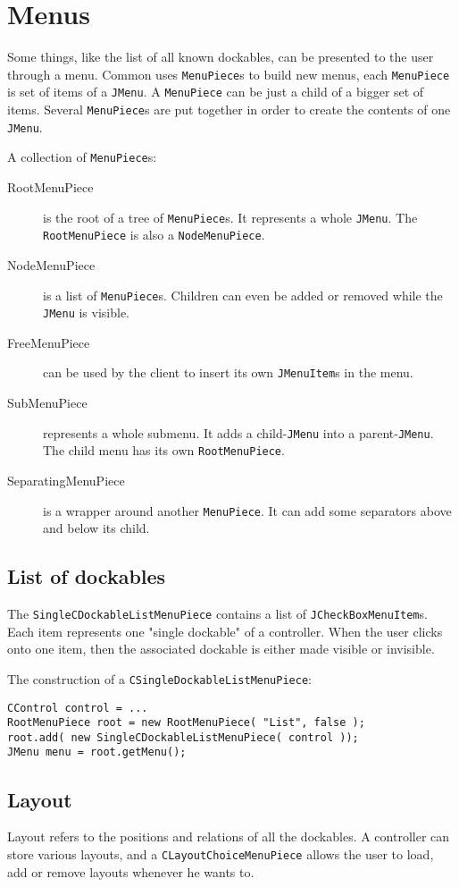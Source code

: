 \documentclass[a4paper,10pt]{article}
\newcommand{\src}[1]{\lstinline[basicstyle=\ttfamily]|#1|}
\begin{document}
\section{Menus}
Some things, like the list of all known dockables, can be presented to the user through a menu. Common uses \src{MenuPiece}s to build new menus, each \src{MenuPiece} is set of items of a \src{JMenu}. A \src{MenuPiece} can be just a child of a bigger set of items. Several \src{MenuPiece}s are put together in order to create the contents of one \src{JMenu}.

A collection of \src{MenuPiece}s:
\begin{description}
 \item[RootMenuPiece] is the root of a tree of \src{MenuPiece}s. It represents a whole \src{JMenu}. The \src{RootMenuPiece} is also a \src{NodeMenuPiece}.
 \item[NodeMenuPiece] is a list of \src{MenuPiece}s. Children can even be added or removed while the \src{JMenu} is visible.
 \item[FreeMenuPiece] can be used by the client to insert its own \src{JMenuItem}s in the menu.
 \item[SubMenuPiece] represents a whole submenu. It adds a child-\src{JMenu} into a parent-\src{JMenu}. The child menu has its own \src{RootMenuPiece}.
 \item[SeparatingMenuPiece] is a wrapper around another \src{MenuPiece}. It can add some separators above and below its child.
\end{description}

\subsection{List of dockables}
The \src{SingleCDockableListMenuPiece} contains a list of \src{JCheckBoxMenuItem}s. Each item represents one "single dockable" of a controller. When the user clicks onto one item, then the associated dockable is either made visible or invisible.

The construction of a \src{CSingleDockableListMenuPiece}:
\begin{lstlisting}
CControl control = ...
RootMenuPiece root = new RootMenuPiece( "List", false );
root.add( new SingleCDockableListMenuPiece( control ));
JMenu menu = root.getMenu();
\end{lstlisting}

\subsection{Layout}
Layout refers to the positions and relations of all the dockables. A controller can store various layouts, and a \src{CLayoutChoiceMenuPiece} allows the user to load, add or remove layouts whenever he wants to.
\end{document}

